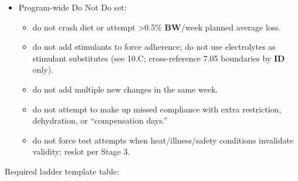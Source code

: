 \documentclass[10pt]{article}
\begin{document}
\begin{itemize}
\begin{itemize}
  \item caffeine routine changes are novelty: no caffeine pattern changes within 14 days of gate windows.
  \end{itemize}
\item Program-wide Do Not Do set:
  \begin{itemize}
  \item do not crash diet or attempt \textgreater0.5\% \textbf{BW}/week planned average loss.
  \item do not add stimulants to force adherence; do not use electrolytes as stimulant substitutes (see 10.C; cross-reference 7.05 boundaries by \textbf{ID} only).
  \item do not add multiple new changes in the same week.
  \item do not attempt to make up missed compliance with extra restriction, dehydration, or “compensation days.”
  \item do not force test attempts when heat/illness/safety conditions invalidate validity; reslot per Stage 3.
  \end{itemize}
\end{itemize}

\newpage

Required ladder template table:

\begingroup
\scriptsize
\setlength{\tabcolsep}{2pt}
\renewcommand{\arraystretch}{1.12}
\end{document}
